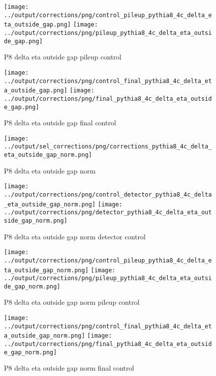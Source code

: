 \documentclass[11pt]{book}
\begin{document}
\begin{figure}[ht]
\centering
\texttt{[image: ../output/corrections/png/control\_pileup\_pythia8\_4c\_delta\_eta\_outside\_gap.png]}
\texttt{[image: ../output/corrections/png/pileup\_pythia8\_4c\_delta\_eta\_outside\_gap.png]}
\caption{P8 delta eta outside gap pileup control}
\label{fig:p8_delta_eta_outside_gap_pileup_control}
\end{figure}


\begin{figure}[ht]
\centering
\texttt{[image: ../output/corrections/png/control\_final\_pythia8\_4c\_delta\_eta\_outside\_gap.png]}
\texttt{[image: ../output/corrections/png/final\_pythia8\_4c\_delta\_eta\_outside\_gap.png]}
\caption{P8 delta eta outside gap final control}
\label{fig:p8_delta_etat_outside_gap_final_control}
\end{figure}


\begin{figure}[ht]
\centering
\texttt{[image: ../output/sel\_corrections/png/corrections\_pythia8\_4c\_delta\_eta\_outside\_gap\_norm.png]}
\caption{P8 delta eta outside gap norm}
\label{fig:p8_delta_eta_outside_gap_norm}
\end{figure}


\begin{figure}[ht]
\centering
\texttt{[image: ../output/corrections/png/control\_detector\_pythia8\_4c\_delta\_eta\_outside\_gap\_norm.png]}
\texttt{[image: ../output/corrections/png/detector\_pythia8\_4c\_delta\_eta\_outside\_gap\_norm.png]}
\caption{P8 delta eta outside gap norm detector control}
\label{fig:p8_delta_eta_outside_gap_norm_detector_control}
\end{figure}

\begin{figure}[ht]
\centering
\texttt{[image: ../output/corrections/png/control\_pileup\_pythia8\_4c\_delta\_eta\_outside\_gap\_norm.png]}
\texttt{[image: ../output/corrections/png/pileup\_pythia8\_4c\_delta\_eta\_outside\_gap\_norm.png]}
\caption{P8 delta eta outside gap norm pileup control}
\label{fig:p8_delta_eta_outside_gap_norm_pileup_control}
\end{figure}


\begin{figure}[ht]
\centering
\texttt{[image: ../output/corrections/png/control\_final\_pythia8\_4c\_delta\_eta\_outside\_gap\_norm.png]}
\texttt{[image: ../output/corrections/png/final\_pythia8\_4c\_delta\_eta\_outside\_gap\_norm.png]}
\caption{P8 delta eta outside gap norm final control}
\label{fig:p8_delta_etat_outside_gap_norm_final_control}
\end{figure}
\end{document}
